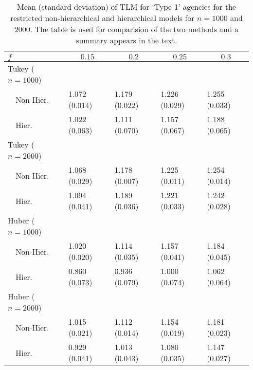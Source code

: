 \begin{table}[!tbp]
{\small
\begin{center}
\begin{tabular}{lllll}
\hline\hline
\multicolumn{1}{l}{$f$}&\multicolumn{1}{c}{$0.15$}&\multicolumn{1}{c}{$0.2$}&\multicolumn{1}{c}{$0.25$}&\multicolumn{1}{c}{$0.3$}\tabularnewline
\hline
{\mdseries Tukey ($n=1000$)}&&&&\tabularnewline
~~Non-Hier.&1.072 (0.014)&1.179 (0.022)&1.226 (0.029)&1.255 (0.033)\tabularnewline
~~Hier.&1.022 (0.063)&1.111 (0.070)&1.157 (0.067)&1.188 (0.065)\tabularnewline
\hline
{\mdseries Tukey ($n=2000$) }&&&&\tabularnewline
~~Non-Hier.&1.068 (0.029)&1.178 (0.007)&1.225 (0.011)&1.254 (0.014)\tabularnewline
~~Hier.&1.094 (0.041)&1.189 (0.036)&1.221 (0.033)&1.242 (0.028)\tabularnewline
\hline
{\mdseries Huber  ($n=1000$)}&&&&\tabularnewline
~~Non-Hier.&1.020 (0.020)&1.114 (0.035)&1.157 (0.041)&1.184 (0.045)\tabularnewline
~~Hier.&0.860 (0.073)&0.936 (0.079)&1.000 (0.074)&1.062 (0.064)\tabularnewline
\hline
{\mdseries Huber ($n=2000$)}&&&&\tabularnewline
~~Non-Hier.&1.015 (0.021)&1.112 (0.014)&1.154 (0.019)&1.181 (0.023)\tabularnewline
~~Hier.&0.929 (0.041)&1.013 (0.043)&1.080 (0.035)&1.147 (0.027)\tabularnewline
\hline
\end{tabular}

\caption{Mean (standard deviation) of TLM for `Type 1' agencies for the restricted non-hierarchical and hierarchical models for $n=1000$ and $2000$. The table is used for comparision of the two methods and a summary appears in the text.\label{tlmTable}}\end{center}}

\end{table}
